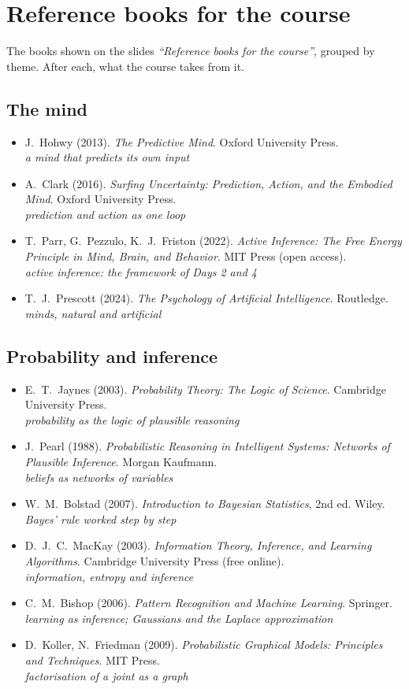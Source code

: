 \documentclass[11pt]{article}
\newcommand{\slide}[1]{\textit{``#1''}}
\begin{document}
\section{Reference books for the course}
The books shown on the slides \slide{Reference books for the course}, grouped by theme. After each, what the course takes from it.

\newcommand{\rb}[2]{\item #1\\{\small\itshape #2}}
\subsection*{The mind}
\begin{itemize}\setlength{\itemsep}{0.15em}
\rb{J.~Hohwy (2013). \emph{The Predictive Mind}. Oxford University Press.}{a mind that predicts its own input}
\rb{A.~Clark (2016). \emph{Surfing Uncertainty: Prediction, Action, and the Embodied Mind}. Oxford University Press.}{prediction and action as one loop}
\rb{T.~Parr, G.~Pezzulo, K.~J.~Friston (2022). \emph{Active Inference: The Free Energy Principle in Mind, Brain, and Behavior}. MIT Press (open access).}{active inference: the framework of Days 2 and 4}
\rb{T.~J.~Prescott (2024). \emph{The Psychology of Artificial Intelligence}. Routledge.}{minds, natural and artificial}
\end{itemize}

\subsection*{Probability and inference}
\begin{itemize}\setlength{\itemsep}{0.15em}
\rb{E.~T.~Jaynes (2003). \emph{Probability Theory: The Logic of Science}. Cambridge University Press.}{probability as the logic of plausible reasoning}
\rb{J.~Pearl (1988). \emph{Probabilistic Reasoning in Intelligent Systems: Networks of Plausible Inference}. Morgan Kaufmann.}{beliefs as networks of variables}
\rb{W.~M.~Bolstad (2007). \emph{Introduction to Bayesian Statistics}, 2nd ed. Wiley.}{Bayes' rule worked step by step}
\rb{D.~J.~C.~MacKay (2003). \emph{Information Theory, Inference, and Learning Algorithms}. Cambridge University Press (free online).}{information, entropy and inference}
\rb{C.~M.~Bishop (2006). \emph{Pattern Recognition and Machine Learning}. Springer.}{learning as inference; Gaussians and the Laplace approximation}
\rb{D.~Koller, N.~Friedman (2009). \emph{Probabilistic Graphical Models: Principles and Techniques}. MIT Press.}{factorisation of a joint as a graph}
\end{itemize}
\end{document}
